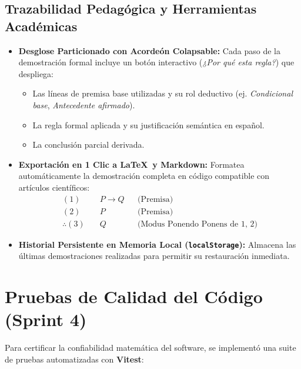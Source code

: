 \documentclass[11pt,a4paper]{article}
\begin{document}
\subsection{Trazabilidad Pedagógica y Herramientas Académicas}
\begin{itemize}[leftmargin=1.2cm]
    \item \textbf{Desglose Particionado con Acordeón Colapsable:} Cada paso de la demostración formal incluye un botón interactivo (\textit{¿Por qué esta regla?}) que despliega:
    \begin{itemize}
        \item Las líneas de premisa base utilizadas y su rol deductivo (ej. \textit{Condicional base}, \textit{Antecedente afirmado}).
        \item La regla formal aplicada y su justificación semántica en español.
        \item La conclusión parcial derivada.
    \end{itemize}
    \item \textbf{Exportación en 1 Clic a \LaTeX\ y Markdown:} Formatea automáticamente la demostración completa en código compatible con artículos científicos:
    $$\begin{aligned}
        (1) \quad & P \to Q && \text{(Premisa)} \\
        (2) \quad & P && \text{(Premisa)} \\
        \therefore (3) \quad & Q && \text{(Modus Ponendo Ponens de 1, 2)}
    \end{aligned}$$
    \item \textbf{Historial Persistente en Memoria Local (\texttt{localStorage}):} Almacena las últimas demostraciones realizadas para permitir su restauración inmediata.
\end{itemize}

\section{Pruebas de Calidad del Código (Sprint 4)}

Para certificar la confiabilidad matemática del software, se implementó una suite de pruebas automatizadas con \textbf{Vitest}:
\end{document}
